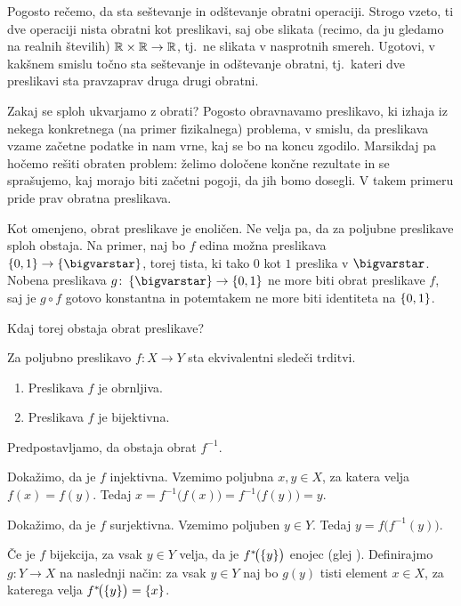 \begin{vaja}
Pogosto rečemo, da sta seštevanje in odštevanje obratni operaciji. Strogo vzeto, ti dve operaciji nista obratni kot preslikavi, saj obe slikata (recimo, da ju gledamo na realnih številih) $\mathbb{R} \times \mathbb{R} \to \mathbb{R}$, tj.~ne slikata v nasprotnih smereh. Ugotovi, v kakšnem smislu točno sta seštevanje in odštevanje obratni, tj.~kateri dve preslikavi sta pravzaprav druga drugi obratni.
\end{vaja}

Zakaj se sploh ukvarjamo z obrati? Pogosto obravnavamo preslikavo, ki izhaja iz nekega konkretnega (na primer fizikalnega) problema, v smislu, da preslikava vzame začetne podatke in nam vrne, kaj se bo na koncu zgodilo. Marsikdaj pa hočemo rešiti obraten problem: želimo določene končne rezultate in se sprašujemo, kaj morajo biti začetni pogoji, da jih bomo dosegli. V takem primeru pride prav obratna preslikava.

Kot omenjeno, obrat preslikave je enoličen. Ne velja pa, da za poljubne preslikave sploh obstaja. Na primer, naj bo $f$ edina možna preslikava $\set{0, 1} \to \set{\unit}$, torej tista, ki tako $0$ kot $1$ preslika v $\unit$. Nobena preslikava $g\colon \set{\unit} \to \set{0, 1}$ ne more biti obrat preslikave $f$, saj je $g \circ f$ gotovo konstantna in potemtakem ne more biti identiteta na $\set{0, 1}$.

Kdaj torej obstaja obrat preslikave?

\begin{trditev}
Za poljubno preslikavo $f\colon X \to Y$ sta ekvivalentni sledeči trditvi.
\begin{enumerate}
\item
Preslikava $f$ je obrnljiva.
\item
Preslikava $f$ je bijektivna.
\end{enumerate}
\end{trditev}

\begin{dokaz}
\begin{implproof}{1}{2}
Predpostavljamo, da obstaja obrat $f^{-1}$.

Dokažimo, da je $f$ injektivna. Vzemimo poljubna $x, y \in X$, za katera velja $f(x) = f(y)$. Tedaj $x = f^{-1}\big(f(x)\big) = f^{-1}\big(f(y)\big) = y$.

Dokažimo, da je $f$ surjektivna. Vzemimo poljuben $y \in Y$. Tedaj $y = f\big(f^{-1}(y)\big)$.
\end{implproof}
\begin{implproof}{2}{1}
Če je $f$ bijekcija, za vsak $y \in Y$ velja, da je $\pim[1]{f}{\set{y}}$ enojec (glej ). Definirajmo $g\colon Y \to X$ na naslednji način: za vsak $y \in Y$ naj bo $g(y)$ tisti element $x \in X$, za katerega velja $\pim[1]{f}{\set{y}} = \set{x}$. 
\end{implproof}
\end{dokaz}

